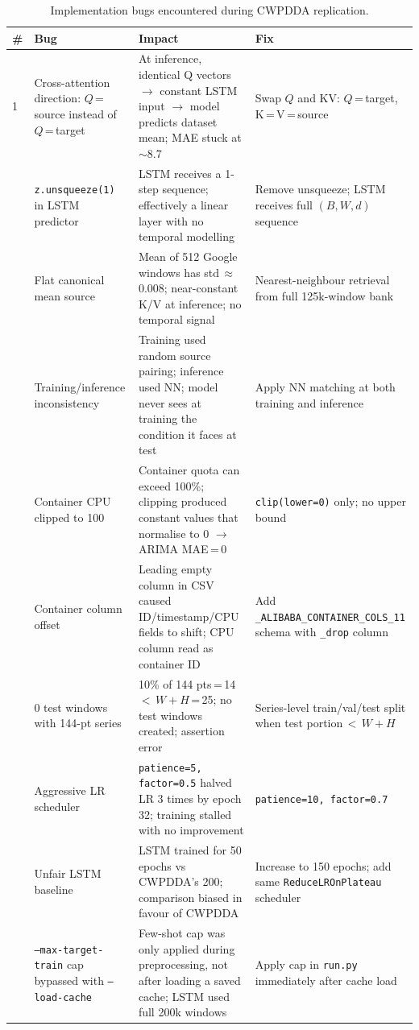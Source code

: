 \documentclass[12pt,a4paper]{article}
\begin{document}
\begin{table}[H]
\centering
\caption{Implementation bugs encountered during CWPDDA replication.}
\label{tab:bugs}
\small
\begin{tabularx}{\textwidth}{@{}lp{4.2cm}p{3.8cm}p{3.8cm}@{}}
\toprule
\textbf{\#} & \textbf{Bug} & \textbf{Impact} & \textbf{Fix} \\
\midrule
1 & Cross-attention direction: $Q$\,=\,source instead of $Q$\,=\,target &
    At inference, identical Q vectors $\rightarrow$ constant LSTM input $\rightarrow$
    model predicts dataset mean; MAE stuck at $\sim$8.7 &
    Swap $Q$ and KV: $Q$\,=\,target, K\,=\,V\,=\,source \\
\addlinespace
2 & \texttt{z.unsqueeze(1)} in LSTM predictor &
    LSTM receives a 1-step sequence; effectively a linear layer with no
    temporal modelling &
    Remove unsqueeze; LSTM receives full $(B, W, d)$ sequence \\
\addlinespace
3 & Flat canonical mean source &
    Mean of 512 Google windows has std\,$\approx$\,0.008; near-constant
    K/V at inference; no temporal signal &
    Nearest-neighbour retrieval from full 125k-window bank \\
\addlinespace
4 & Training/inference inconsistency &
    Training used random source pairing; inference used NN; model never
    sees at training the condition it faces at test &
    Apply NN matching at both training and inference \\
\addlinespace
5 & Container CPU clipped to 100 &
    Container quota can exceed 100\%; clipping produced constant values
    that normalise to 0 $\rightarrow$ ARIMA MAE\,=\,0 &
    \texttt{clip(lower=0)} only; no upper bound \\
\addlinespace
6 & Container column offset &
    Leading empty column in CSV caused ID/timestamp/CPU fields to shift;
    CPU column read as container ID &
    Add \texttt{\_ALIBABA\_CONTAINER\_COLS\_11} schema with \texttt{\_drop}
    column \\
\addlinespace
7 & 0 test windows with 144-pt series &
    10\% of 144 pts\,=\,14\,$<$\,$W+H$\,=\,25; no test windows created;
    assertion error &
    Series-level train/val/test split when test portion\,$<$\,$W+H$ \\
\addlinespace
8 & Aggressive LR scheduler &
    \texttt{patience=5, factor=0.5} halved LR 3 times by epoch 32;
    training stalled with no improvement &
    \texttt{patience=10, factor=0.7} \\
\addlinespace
9 & Unfair LSTM baseline &
    LSTM trained for 50 epochs vs CWPDDA's 200; comparison biased
    in favour of CWPDDA &
    Increase to 150 epochs; add same \texttt{ReduceLROnPlateau} scheduler \\
\addlinespace
10 & \texttt{--max-target-train} cap bypassed with \texttt{--load-cache} &
    Few-shot cap was only applied during preprocessing, not after
    loading a saved cache; LSTM used full 200k windows &
    Apply cap in \texttt{run.py} immediately after cache load \\
\bottomrule
\end{tabularx}
\end{table}
\end{document}
